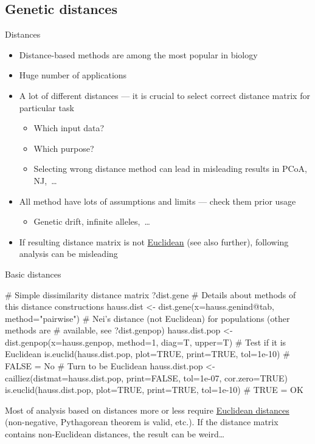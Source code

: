 \documentclass[compress, ucs, xelatex, 11pt, xcolor=svgnames, aspectratio=169,
	hyperref={
		bookmarks=true,
		unicode=true,
		colorlinks=true,
		pdftitle={Molecular data in R},
		plainpages=false,
		pdfauthor={Vojtech Zeisek},
		pdfsubject={Course about phylogeny and evolution in R},
		pdfcreator={XeLaTeX},
		pdfkeywords={R, evolution, phylogeny, molecular data},
		linkcolor=Crimson, %
		anchorcolor=Magenta, %
		citecolor=Magenta, %
		filecolor=Magenta, %
		menucolor=Magenta, %
		urlcolor=DodgerBlue, %
		pdftex},
	url={hyphens, lowtilde} %
	]{beamer}
\begin{document}
\subsection{Genetic distances}

\begin{frame}[fragile]{Distances}
	\label{distances}
	\begin{itemize}
		\item Distance-based methods are among the most popular in biology
		\item Huge number of applications
		\item A lot of different distances --- it is crucial to select correct distance matrix for particular task
		\begin{itemize}
			\item Which input data?
			\item Which purpose?
			\item Selecting wrong distance method can lead in misleading results in PCoA, NJ,~\ldots
		\end{itemize}
		\item All method have lots of assumptions and limits --- check them prior usage
		\begin{itemize}
			\item Genetic drift, infinite alleles,~\ldots
		\end{itemize}
		\item If resulting distance matrix is not \href{https://en.wikipedia.org/wiki/Euclidean_distance_matrix}{Euclidean} (see also further), following analysis can be misleading
	\end{itemize}
\end{frame}

\begin{frame}[fragile]{Basic distances}
	\begin{spluscode}
    # Simple dissimilarity distance matrix
    ?dist.gene # Details about methods of this distance constructions
    hauss.dist <- dist.gene(x=hauss.genind@tab, method="pairwise")
    # Nei's distance (not Euclidean) for populations (other methods are
    # available, see ?dist.genpop)
    hauss.dist.pop <- dist.genpop(x=hauss.genpop, method=1, diag=T, upper=T)
    # Test if it is Euclidean
    is.euclid(hauss.dist.pop, plot=TRUE, print=TRUE, tol=1e-10) # FALSE = No
    # Turn to be Euclidean
    hauss.dist.pop <- cailliez(distmat=hauss.dist.pop, print=FALSE, tol=1e-07,
      cor.zero=TRUE)
    is.euclid(hauss.dist.pop, plot=TRUE, print=TRUE, tol=1e-10) # TRUE = OK
	\end{spluscode}
	\vfil
	Most of analysis based on distances more or less require \href{https://en.wikipedia.org/wiki/Euclidean_distance_matrix}{Euclidean distances} (non-negative, Pythagorean theorem is valid, etc.). If the distance matrix contains non-Euclidean distances, the result can be weird\ldots
	\vfill
\end{frame}
\end{document}
